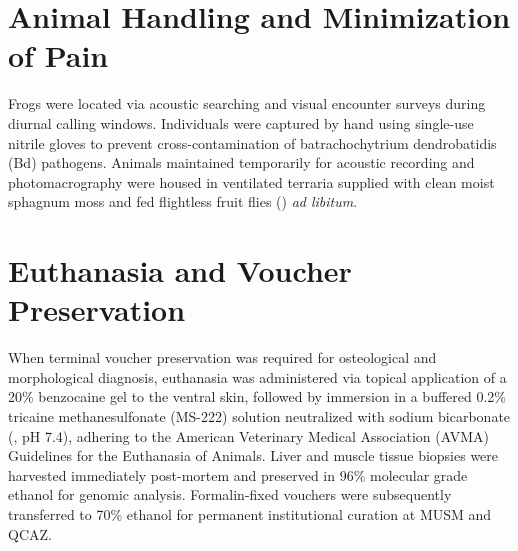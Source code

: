 \section*{Animal Handling and Minimization of Pain}
Frogs were located via acoustic searching and visual encounter surveys during diurnal calling windows. Individuals were captured by hand using single-use nitrile gloves to prevent cross-contamination of batrachochytrium dendrobatidis (Bd) pathogens. Animals maintained temporarily for acoustic recording and photomacrography were housed in ventilated terraria supplied with clean moist sphagnum moss and fed flightless fruit flies () \textit{ad libitum}.

\section*{Euthanasia and Voucher Preservation}
When terminal voucher preservation was required for osteological and morphological diagnosis, euthanasia was administered via topical application of a 20\% benzocaine gel to the ventral skin, followed by immersion in a buffered 0.2\% tricaine methanesulfonate (MS-222) solution neutralized with sodium bicarbonate (, pH 7.4), adhering to the American Veterinary Medical Association (AVMA) Guidelines for the Euthanasia of Animals. Liver and muscle tissue biopsies were harvested immediately post-mortem and preserved in 96\% molecular grade ethanol for genomic analysis. Formalin-fixed vouchers were subsequently transferred to 70\% ethanol for permanent institutional curation at MUSM and QCAZ.
